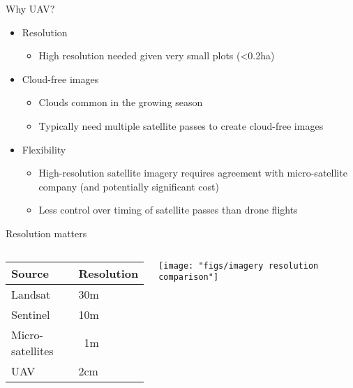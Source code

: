 \documentclass{beamer}
\begin{document}
\begin{frame}{Why UAV?}
	\begin{itemize}
		\item Resolution
			\begin{itemize}
				\item High resolution needed given very small plots (<0.2ha)
			\end{itemize}
		\item Cloud-free images
			\begin{itemize}
				\item Clouds common in the growing season
				\item Typically need multiple satellite passes to create cloud-free images
			\end{itemize}
		\item Flexibility
			\begin{itemize}
				\item High-resolution satellite imagery requires agreement with micro-satellite company (and potentially significant cost)
				\item Less control over timing of satellite passes than drone flights
			\end{itemize}
	\end{itemize}			
\end{frame}
			
			
\begin{frame}{Resolution matters}
\begin{columns}
	\begin{column}{0.5\textwidth}
		\begin{tabular}{|l|l|}
			\hline 
			Source & Resolution \\ 
			\hline 
			Landsat & 30m \\ 
			\hline 
			Sentinel & 10m \\ 
			\hline 
			Micro-satellites & ~1m \\ 
			\hline 
			UAV & 2cm \\ 
			\hline 
		\end{tabular} 
	\end{column}
	\begin{column}{0.5\textwidth}
		\begin{center}
		\texttt{[image: "figs/imagery resolution comparison"]}
		\end{center}
	\end{column}
	\end{columns}
	
	

\end{frame}
\end{document}
